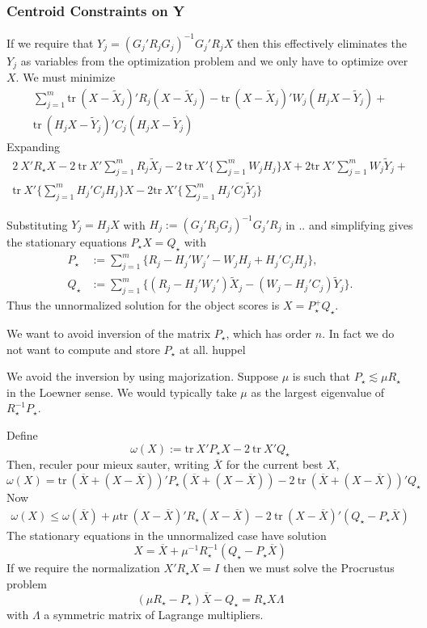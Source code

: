 \documentclass[
  12pt,
]{article}
\begin{document}
\subsubsection{Centroid Constraints on Y}\label{centroid-constraints-on-y}

If we require that \(Y_j=(G_j'R_jG_j)^{-1}G_j'R_jX\) then this effectively eliminates the \(Y_j\) as variables from the optimization problem and we only have to optimize over \(X\). We must minimize
\begin{multline}
\sum_{j=1}^m\text{tr}\ (X-\tilde X_j)'R_j(X-\tilde X_j) -
\text{tr}\ (X-\tilde X_j)'W_j(H_jX-\tilde Y_j)+\\
\text{tr}\ (H_jX-\tilde Y_j)'C_j(H_jX-\tilde Y_j)
\end{multline}
Expanding
\begin{multline}
2\ X'R_\star X-2\ \text{tr}\ X'\sum_{j=1}^mR_j\tilde X_j-2\ \text{tr}\ X'\{\sum_{j=1}^mW_jH_j\}X + 2\text{tr}\ X'\sum_{j=1}^mW_j\tilde Y_j+\\
\text{tr}\ X'\{\sum_{j=1}^mH_j'C_jH_j\}X-2\text{tr}\ X'\{\sum_{j=1}^mH_j'C_j\tilde Y_j\}
\end{multline}

Substituting \(Y_j=H_jX\) with \(H_j:=(G_j'R_jG_j)^{-1}G_j'R_j\) in .. and simplifying gives
the stationary equations \(P_\star X= Q_\star\) with
\begin{subequations}
\begin{align}
P_\star&:=\sum_{j=1}^m\{R_j-H_j'W_j'-W_jH_j+H_j'C_jH_j\},\\
Q_\star&:=\sum_{j=1}^m\{(R_j-H_j'W_j')\tilde X_j-(W_j-H_j'C_j)\tilde Y_j\}.
\end{align}
\end{subequations}
Thus the unnormalized solution for the object scores is \(X=P^+_\star Q_\star\).

We want to avoid inversion of the matrix \(P_\star\), which has order \(n\). In fact we do not want to compute and store \(P_\star\) at all. huppel

We avoid the inversion by using majorization. Suppose \(\mu\) is such that \(P_\star\lesssim\mu R_\star\) in the Loewner sense. We would typically take \(\mu\) as the largest eigenvalue of \(R_\star^{-1}P_\star\).

Define
\[
\omega(X):=\text{tr}\ X'P_\star X-2\ \text{tr}\ X'Q_\star
\]
Then, reculer pour mieux sauter, writing \(\overline{X}\) for the current best
\(X\),
\[
\omega(X)=\text{tr}\ (\overline X+(X-\overline X))'P_\star(\overline X+(X-\overline X))-2\ \text{tr}\ (\overline X+(X-\overline X))'Q_\star
\]
Now
\begin{multline}
\omega(X)\leq\omega(\overline X)+
\mu\text{tr}\ (X-\overline X)'R_\star(X-\overline X)-2\ \text{tr}\ (X-\overline X)'(Q_\star-P_\star\overline X)
\end{multline}
The stationary equations in the unnormalized case have solution
\[
X=\overline X+\mu^{-1}R_\star^{-1}(Q_\star-P_\star\overline X)
\]
If we require the normalization \(X'R_\star X=I\) then we must solve the Procrustus problem
\[
(\mu R_\star-P_\star)\overline X - Q_\star=R_\star X\Lambda
\]
with \(\Lambda\) a symmetric matrix of Lagrange multipliers.
\end{document}
